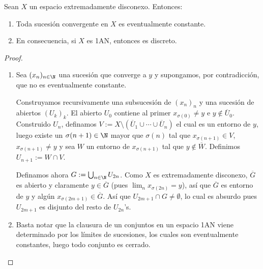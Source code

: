 \documentclass[topologia-analisis.tex]{subfiles}
\begin{document}
\begin{thm}
	Sean $X$ un espacio extremadamente disconexo. Entonces:
	\begin{enumerate}
		\item Toda sucesión convergente en $X$ es eventualmente constante.
		\item En consecuencia, si $X$ es 1AN, entonces es discreto.
	\end{enumerate}
\end{thm}
\begin{proof}
	\begin{enumerate}
		\item Sea $(x_n)_{n\in\N}$ una sucesión que converge a $y$ y supongamos, por contradicción, que no es eventualmente constante.

			Construyamos recursivamente una subsucesión de $(x_n)_n$ y una sucesión de abiertos $(U_k)_k$.
			El abierto $U_0$ contiene al primer $x_{\sigma(0)} \ne y$ e $y \notin \overline{U}_0$.
			Construido $U_n$, definamos $V := X \setminus ( \overline{U}_1 \cup \cdots \cup \overline{U}_n )$ el cual es un entorno de $y$,
			luego existe un $\sigma(n+1) \in \N$ mayor que $\sigma(n)$ tal que $x_{\sigma(n+1)} \in V$, $x_{\sigma(n+1)} \ne y$
			y sea $W$ un entorno de $x_{\sigma(n+1)}$ tal que $y \notin \overline{W}$.
			Definimos $U_{n+1} := W \cap V$.

			Definamos ahora $G := \bigcup_{n \in \N} U_{2n}$. Como $X$ es extremadamente disconexo, $\overline{G}$ es abierto
			y claramente $y \in \overline{G}$ (pues $\lim_n x_{\sigma(2n)} = y$), así que $\overline{G}$ es entorno de $y$
			y algún $x_{\sigma(2m+1)} \in \overline{G}$. Así que $U_{2m+1} \cap G \ne \emptyset$, lo cual es absurdo pues $U_{2m+1}$
			es disjunto del resto de $U_{2n}$'s.

		\item Basta notar que la clausura de un conjuntos en un espacio 1AN viene determinado por los límites de sucesiones,
			los cuales son eventualmente constantes, luego todo conjunto es cerrado. \qedhere
	\end{enumerate}
\end{proof}
\end{document}
